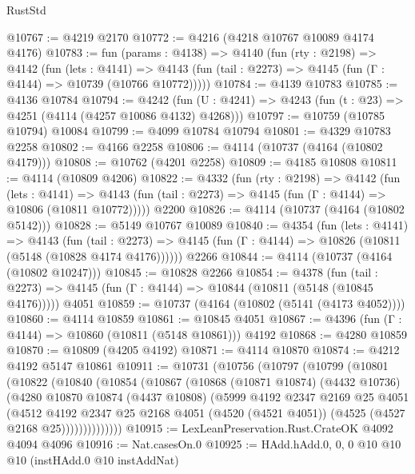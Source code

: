 \begin{lexlean}{RustStd}
\begin{coremodule}
{\begin{coremodule}
{{{{{{{{{{{{{{@10767 := @4219 @2170
@10772 := @4216 (@4218 @10767 @10089 @4174 @4176)
@10783 := fun (params : @4138) =>
  @4140
    (fun (rty : @2198) =>
    @4142
      (fun (lets : @4141) =>
      @4143 (fun (tail : @2273) => @4145 (fun (Γ : @4144) => @10739 (@10766 @10772)))))
@10784 := @4139 @10783
@10785 := @4136 @10784
@10794 := @4242
    (fun (U : @4241) => @4243 (fun (t : @23) => @4251 (@4114 (@4257 @10086 @4132) @4268)))
@10797 := @10759 (@10785 @10794) @10084
@10799 := @4099 @10784 @10794
@10801 := @4329 @10783 @2258
@10802 := @4166 @2258
@10806 := @4114 (@10737 (@4164 (@10802 @4179)))
@10808 := @10762 (@4201 @2258)
@10809 := @4185 @10808
@10811 := @4114 (@10809 @4206)
@10822 := @4332
    (fun (rty : @2198) =>
    @4142
      (fun (lets : @4141) =>
      @4143 (fun (tail : @2273) => @4145 (fun (Γ : @4144) => @10806 (@10811 @10772)))))
    @2200
@10826 := @4114 (@10737 (@4164 (@10802 @5142)))
@10828 := @5149 @10767 @10089
@10840 := @4354
    (fun (lets : @4141) =>
    @4143
      (fun (tail : @2273) =>
      @4145 (fun (Γ : @4144) => @10826 (@10811 (@5148 (@10828 @4174 @4176))))))
    @2266
@10844 := @4114 (@10737 (@4164 (@10802 @10247)))
@10845 := @10828 @2266
@10854 := @4378
    (fun (tail : @2273) => @4145 (fun (Γ : @4144) => @10844 (@10811 (@5148 (@10845 @4176)))))
    @4051
@10859 := @10737 (@4164 (@10802 (@5141 (@4173 @4052))))
@10860 := @4114 @10859
@10861 := @10845 @4051
@10867 := @4396 (fun (Γ : @4144) => @10860 (@10811 (@5148 @10861))) @4192
@10868 := @4280 @10859
@10870 := @10809 (@4205 @4192)
@10871 := @4114 @10870
@10874 := @4212 @4192 @5147 @10861
@10911 := @10731
    (@10756
      (@10797
        (@10799
          (@10801
            (@10822
              (@10840
                (@10854
                  (@10867
                    (@10868
                      (@10871 @10874)
                      (@4432 @10736)
                      (@4280
                        @10870
                        @10874
                        (@4437 @10808)
                        (@5999
                          @4192
                          @2347
                          @2169
                          @25
                          @4051
                          (@4512
                            @4192
                            @2347
                            @25
                            @2168
                            @4051
                            (@4520 (@4521 @4051))
                            (@4525 (@4527 @2168 @25))))))))))))))
@10915 := LexLeanPreservation.Rust.CrateOK @4092 @4094 @4096
@10916 := Nat.casesOn.{0}
@10925 := HAdd.hAdd.{0, 0, 0} @10 @10 @10 (instHAdd.{0} @10 instAddNat)
}}}}}}}}}}}}}}
\end{coremodule}}
\end{coremodule}
\end{lexlean}
